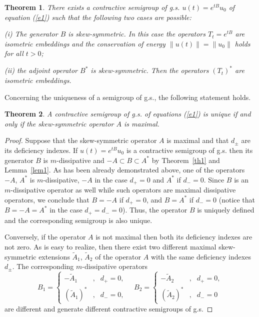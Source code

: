 \documentclass[12pt]{article}
\numberwithin{equation}{section}
\theoremstyle{plain}
\newtheorem{theorem}{Theorem}[section]
\theoremstyle{definition}
\begin{document}
\begin{theorem}\label{th2}
There exists a contractive semigroup of g.s. $u(t)=e^{tB}u_0$ of equation (\ref{e1}) such that the following two cases are possible:

(i) The generator $B$ is skew-symmetric. In this case the operators $T_t=e^{tB}$ are isometric embeddings and the conservation of energy $\|u(t)\|=\|u_0\|$ holds for all $t>0$;

(ii) the adjoint operator $B^*$ is skew-symmetric. Then the operators $(T_t)^*$ are isometric embeddings.
\end{theorem}

Concerning the uniqueness of a semigroup of g.s., the following statement holds.

\begin{theorem}\label{th3}
A contractive semigroup of g.s. of equations (\ref{e1}) is unique if and only if the skew-symmetric operator $A$ is maximal.
\end{theorem}

\begin{proof}
Suppose that the skew-symmetric operator $A$ is maximal and that $d_\pm$ are its deficiency indexes. If $u(t)=e^{tB}u_0$ is a contractive semigroup of g.s. then its generator $B$ is $m$-dissipative and $-A\subset B\subset A^*$ by Theorem~\ref{th1} and Lemma~\ref{lem1}. As has been already demonstrated above, one of the operators $-A$, $A^*$ is $m$-dissipative, $-A$ in the case $d_+=0$ and $A^*$ if $d_-=0$. Since $B$ is an $m$-dissipative operator as well while such operators are maximal dissipative operators, we conclude that $B=-A$ if $d_+=0$, and $B=A^*$ if $d_-=0$ (notice that $B=-A=A^*$ in the case $d_+=d_-=0$). Thus, the operator $B$ is uniquely defined and the corresponding semigroup is also unique.

Conversely, if the operator $A$ is not maximal then both its deficiency indexes are not zero. As is easy to realize, then there exist two different maximal skew-symmetric extensions $\tilde A_1$, $\tilde A_2$ of the operator $A$ with the same deficiency  indexes $d_\pm$. The corresponding $m$-dissipative operators \[B_1=\left\{\begin{array}{lcr} -\tilde A_1 & , & d_+=0, \\ (\tilde A_1)^* & , & d_-=0, \end{array}\right. \quad B_2=\left\{\begin{array}{lcr} -\tilde A_2 & , & d_+=0, \\ (\tilde A_2)^* & , & d_-=0 \end{array}\right.\] are different and generate different contractive semigroups of g.s.
\end{proof}
\end{document}
